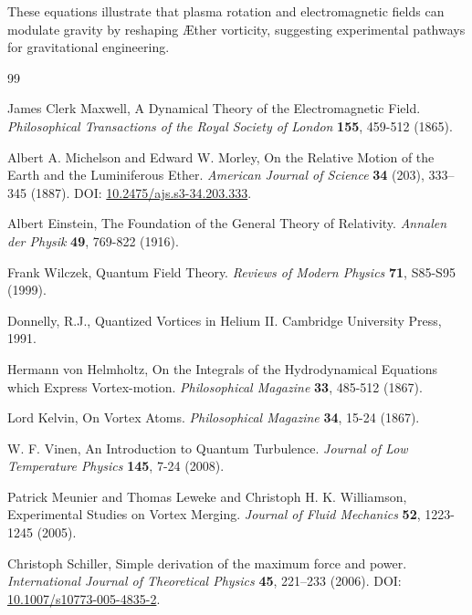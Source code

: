 \documentclass[a4paper,12pt]{article}
\begin{document}
These equations illustrate that plasma rotation and electromagnetic fields can modulate gravity by reshaping Æther vorticity, suggesting experimental pathways for gravitational engineering.
\label{appendix:11}

\begin{thebibliography}{99}

James Clerk Maxwell,
\newblock A Dynamical Theory of the Electromagnetic Field.
\textit{Philosophical Transactions of the Royal Society of London} \textbf{155}, 459-512 (1865).


Albert A. Michelson and Edward W. Morley,
\newblock On the Relative Motion of the Earth and the Luminiferous Ether.
\textit{American Journal of Science} \textbf{34} (203), 333--345 (1887).
\newblock DOI: \href{https://doi.org/10.2475/ajs.s3-34.203.333}{10.2475/ajs.s3-34.203.333}.


Albert Einstein,
\newblock The Foundation of the General Theory of Relativity.
\textit{Annalen der Physik} \textbf{49}, 769-822 (1916).


Frank Wilczek,
\newblock Quantum Field Theory.
\textit{Reviews of Modern Physics} \textbf{71}, S85-S95 (1999).


Donnelly, R.J.,
\newblock Quantized Vortices in Helium II.
\newblock Cambridge University Press, 1991.


Hermann von Helmholtz,
\newblock On the Integrals of the Hydrodynamical Equations which Express Vortex-motion.
\textit{Philosophical Magazine} \textbf{33}, 485-512 (1867).


Lord Kelvin,
\newblock On Vortex Atoms.
\textit{Philosophical Magazine} \textbf{34}, 15-24 (1867).


W. F. Vinen,
\newblock An Introduction to Quantum Turbulence.
\textit{Journal of Low Temperature Physics} \textbf{145}, 7-24 (2008).


Patrick Meunier and Thomas Leweke and Christoph H. K. Williamson,
\newblock Experimental Studies on Vortex Merging.
\textit{Journal of Fluid Mechanics} \textbf{52}, 1223-1245 (2005).


Christoph Schiller,
\newblock Simple derivation of the maximum force and power.
\textit{International Journal of Theoretical Physics} \textbf{45}, 221–233 (2006).
\newblock DOI: \href{https://doi.org/10.1007/s10773-005-4835-2}{10.1007/s10773-005-4835-2}.



\end{thebibliography}
\end{document}
